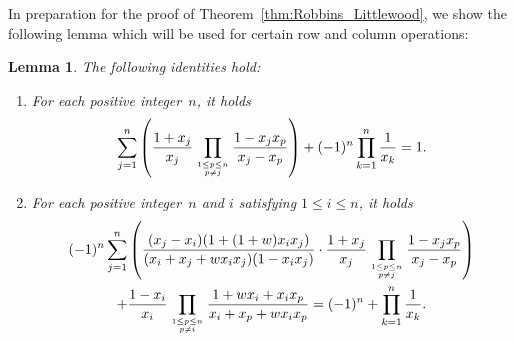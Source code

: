\documentclass[10pt,a4paper]{article}
\newtheorem{lem}[thm]{Lemma}
\theoremstyle{definition}
\newcommand\myatop[2]{\genfrac{}{}{0pt}{}{#1}{#2}}
\begin{document}
	In preparation for the proof of Theorem~\ref{thm:Robbins_Littlewood}, we show the following lemma which will be used for certain row and column operations:

	\begin{lem}\label{lem:MatrixOperationEven}
		The following identities hold:
		\begin{enumerate}[label=(\roman*)]
			\item\label{eq:MatrixOperationEven2} For each positive integer~$n$, it holds
			\begin{equation*}
				\sum_{j=1}^{n} \left(\frac{1+x_j}{x_j} \prod_{\myatop{1 \le p \le n}{p \neq j}} \frac{1-x_j x_p}{x_j -x_p} \right) + (-1)^n \prod_{k=1}^{n} \frac{1}{x_k} = 1.
			\end{equation*}
			\item\label{eq:MatrixOperationEven1} For each positive integer~$n$ and $i$ satisfying $1 \le i \le n$, it holds
			\begin{multline*}
				(-1)^n \sum_{j=1}^{n} \left( \frac{(x_j-x_i)(1+(1+w) x_i x_j)}{(x_i+x_j+w x_i x_j)(1-x_i x_j)} \cdot \frac{1+x_j}{x_j} \prod_{\myatop{1 \le p \le n}{p \neq j}} \frac{1-x_j x_p}{x_j -x_p} \right)\\
				+ \frac{1-x_i}{x_i} \prod\limits_{\myatop{1 \le p \le n}{p \neq i}} \frac{1+ w x_i + x_i x_p}{x_i + x_p + w x_i x_p} = (-1)^n+\prod_{k=1}^{n} \frac{1}{x_k}.
			\end{multline*}
		\end{enumerate}
	\end{lem}
	
\end{document}

